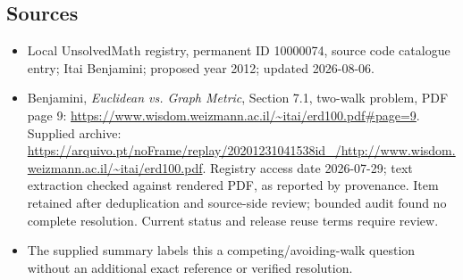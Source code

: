 \documentclass[11pt]{article}
\begin{document}
\subsection{Sources}
\begin{itemize}
\item Local UnsolvedMath registry, permanent ID 10000074, source code catalogue entry; Itai Benjamini; proposed year 2012; updated 2026-08-06.
\item Benjamini, \emph{Euclidean vs. Graph Metric}, Section 7.1, two-walk problem, PDF page 9: \url{https://www.wisdom.weizmann.ac.il/~itai/erd100.pdf#page=9}. Supplied archive: \url{https://arquivo.pt/noFrame/replay/20201231041538id_/http://www.wisdom.weizmann.ac.il/~itai/erd100.pdf}. Registry access date 2026-07-29; text extraction checked against rendered PDF, as reported by provenance. Item retained after deduplication and source-side review; bounded audit found no complete resolution. Current status and release reuse terms require review.
\item The supplied summary labels this a competing/avoiding-walk question without an additional exact reference or verified resolution.
\end{itemize}
\end{document}
